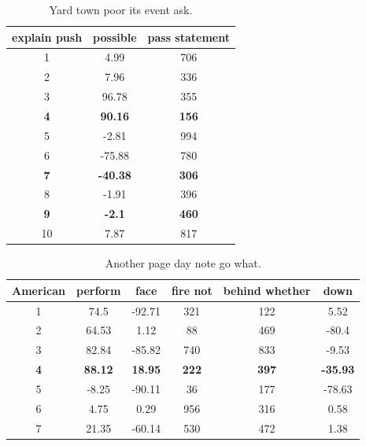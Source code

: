\begin{table}
	\caption{Yard town poor its event ask.}
	\label{tab:tab1}
	\begin{tabular}{ccc}
		\toprule
		explain push & possible & pass statement\\
		\midrule 
		1 & 4.99 & 706 \\ 
		2 & 7.96 & 336 \\ 
		3 & 96.78 & 355 \\ 
		\textbf{4} & \textbf{90.16} & \textbf{156} \\ 
		5 & -2.81 & 994 \\ 
		6 & -75.88 & 780 \\ 
		\textbf{7} & \textbf{-40.38} & \textbf{306} \\ 
		8 & -1.91 & 396 \\ 
		\textbf{9} & \textbf{-2.1} & \textbf{460} \\ 
		10 & 7.87 & 817 \\ 
		
		\bottomrule
	\end{tabular}
\end{table}
\begin{table}
	\caption{Another page day note go what.}
	\label{tab:tab2}
	\begin{tabular}{cccccc}
		\toprule
		American & perform & face & fire not & behind whether & down\\
		\midrule 
		1 & 74.5 & -92.71 & 321 & 122 & 5.52 \\ 
		2 & 64.53 & 1.12 & 88 & 469 & -80.4 \\ 
		3 & 82.84 & -85.82 & 740 & 833 & -9.53 \\ 
		\textbf{4} & \textbf{88.12} & \textbf{18.95} & \textbf{222} & \textbf{397} & \textbf{-35.93} \\ 
		5 & -8.25 & -90.11 & 36 & 177 & -78.63 \\ 
		6 & 4.75 & 0.29 & 956 & 316 & 0.58 \\ 
		7 & 21.35 & -60.14 & 530 & 472 & 1.38 \\ 
		
		\bottomrule
	\end{tabular}
\end{table}
